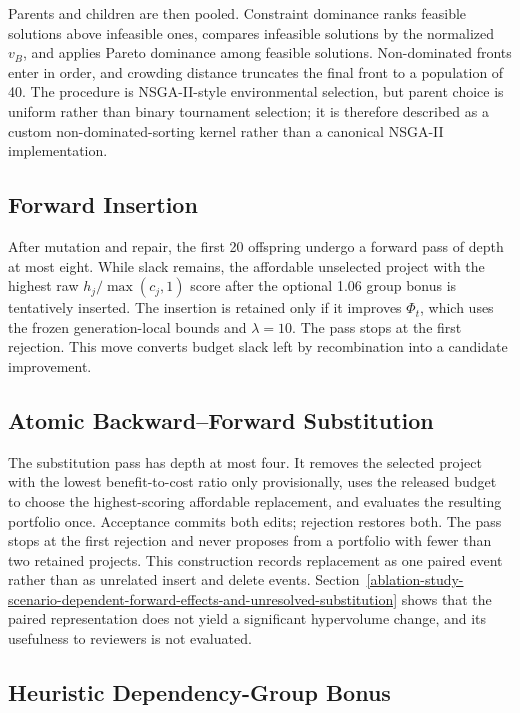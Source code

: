 \documentclass[applsci,article,submit,moreauthors]{Definitions/mdpi}
\begin{document}
Parents and children are then pooled. Constraint dominance ranks feasible solutions above infeasible ones, compares infeasible solutions by the normalized \(v_B\), and applies Pareto dominance among feasible solutions. Non-dominated fronts enter in order, and crowding distance truncates the final front to a population of 40. The procedure is NSGA-II-style environmental selection, but parent choice is uniform rather than binary tournament selection; it is therefore described as a custom non-dominated-sorting kernel rather than a canonical NSGA-II implementation.

\subsection{Forward Insertion}\label{forward-insertion}

After mutation and repair, the first 20 offspring undergo a forward pass of depth at most eight. While slack remains, the affordable unselected project with the highest raw \(h_j/\max(c_j,1)\) score after the optional 1.06 group bonus is tentatively inserted. The insertion is retained only if it improves \(\Phi_t\), which uses the frozen generation-local bounds and \(\lambda=10\). The pass stops at the first rejection. This move converts budget slack left by recombination into a candidate improvement.

\subsection{Atomic Backward--Forward Substitution}\label{atomic-backwardforward-substitution}

The substitution pass has depth at most four. It removes the selected project with the lowest benefit-to-cost ratio only provisionally, uses the released budget to choose the highest-scoring affordable replacement, and evaluates the resulting portfolio once. Acceptance commits both edits; rejection restores both. The pass stops at the first rejection and never proposes from a portfolio with fewer than two retained projects. This construction records replacement as one paired event rather than as unrelated insert and delete events. Section~\ref{ablation-study-scenario-dependent-forward-effects-and-unresolved-substitution} shows that the paired representation does not yield a significant hypervolume change, and its usefulness to reviewers is not evaluated.

\subsection{Heuristic Dependency-Group Bonus}\label{heuristic-dependency-group-bonus}
\end{document}

